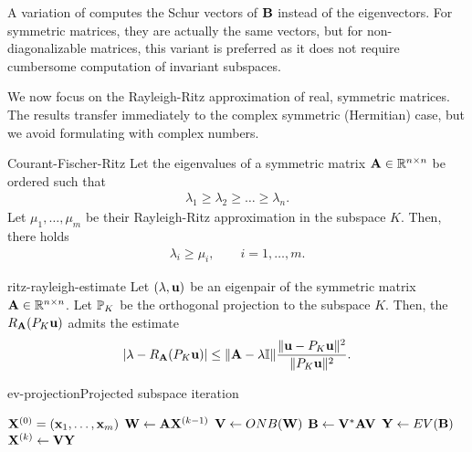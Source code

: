 \begin{remark}
  A variation of  computes the
  Schur vectors of $\matb$ instead of the eigenvectors. For symmetric
  matrices, they are actually the same vectors, but for
  non-diagonalizable matrices, this variant is preferred as it does
  not require cumbersome computation of invariant subspaces.
\end{remark}

\begin{intro}
  We now focus on the Rayleigh-Ritz approximation of real, symmetric
  matrices. The results transfer immediately to the complex symmetric
  (Hermitian) case, but we avoid formulating with complex numbers.
\end{intro}

\begin{Lemma}{Courant-Fischer-Ritz}
  Let the eigenvalues of a symmetric matrix $\mata\in\Rnn$ be ordered such that
  \begin{gather}
    \lambda_1\ge \lambda_2\ge \dots \ge \lambda_n.
  \end{gather}
  Let $\mu_1,\dots,\mu_m$ be their Rayleigh-Ritz approximation in the
  subspace $K$. Then, there holds
  \begin{gather}
    \lambda_i \ge \mu_i, \qquad i=1,\dots,m.
  \end{gather}
\end{Lemma}

\begin{Lemma}{ritz-rayleigh-estimate}
  Let $(\lambda,\vu)$ be an eigenpair of the symmetric matrix
  $\mata\in\Rnn$. Let $\P_K$ be the orthogonal projection to the
  subspace $K$. Then, the 
  $R_\mata(P_K \vu)$ admits the estimate
  \begin{gather}
    \abs*{\lambda-R_\mata(P_K \vu)}
    \le \norm{\mata-\lambda\id}
    \frac{\norm{\vu-P_K\vu}^2}{\norm{P_K\vu}^2}.
  \end{gather}
\end{Lemma}


\begin{Algorithm*}{ev-projection}{Projected subspace iteration}
  \begin{algorithmic}[1]
    \Require $\matx^{(0)} = (\vx_1,\dots,\vx_m)$
    \State $\matw \gets \mata\matx^{(k-1)}$
    \State $\matv \gets ONB(\matw)$ 
    \State $\matb \gets \matv^*\mata\matv$ 
    \State $\maty \gets EV(\matb)$ 
    \State $\matx^{(k)} \gets \matv\maty$
    \EndFor
  \end{algorithmic}
\end{Algorithm*}

